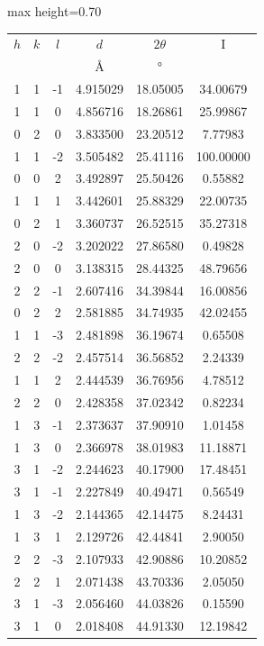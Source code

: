 \documentclass[twoside,a4paper,11pt,addpoints,answers]{exam}%
\begin{document}
\begin{center}
\begin{adjustbox}{max height=0.70\textwidth}
\begin{tabular}{cccccc}
\toprule
$h$ & $k$ & $l$ & $d$ & $2 \theta$ & I \\
 & & & \si{\angstrom} &  \si{\degree} &  \\  
\midrule
 1 & 1 & -1 &  4.915029 &  18.05005 &  34.00679 \\
 1 & 1 &  0 &  4.856716 &  18.26861 &  25.99867 \\
 0 & 2 &  0 &  3.833500 &  23.20512 &   7.77983 \\
 1 & 1 & -2 &  3.505482 &  25.41116 & 100.00000 \\
 0 & 0 &  2 &  3.492897 &  25.50426 &   0.55882 \\
 1 & 1 &  1 &  3.442601 &  25.88329 &  22.00735 \\
 0 & 2 &  1 &  3.360737 &  26.52515 &  35.27318 \\
 2 & 0 & -2 &  3.202022 &  27.86580 &   0.49828 \\
 2 & 0 &  0 &  3.138315 &  28.44325 &  48.79656 \\
 2 & 2 & -1 &  2.607416 &  34.39844 &  16.00856 \\
 0 & 2 &  2 &  2.581885 &  34.74935 &  42.02455 \\
 1 & 1 & -3 &  2.481898 &  36.19674 &   0.65508 \\
 2 & 2 & -2 &  2.457514 &  36.56852 &   2.24339 \\
 1 & 1 &  2 &  2.444539 &  36.76956 &   4.78512 \\
 2 & 2 &  0 &  2.428358 &  37.02342 &   0.82234 \\
 1 & 3 & -1 &  2.373637 &  37.90910 &   1.01458 \\
 1 & 3 &  0 &  2.366978 &  38.01983 &  11.18871 \\
 3 & 1 & -2 &  2.244623 &  40.17900 &  17.48451 \\
 3 & 1 & -1 &  2.227849 &  40.49471 &   0.56549 \\
 1 & 3 & -2 &  2.144365 &  42.14475 &   8.24431 \\
 1 & 3 &  1 &  2.129726 &  42.44841 &   2.90050 \\
 2 & 2 & -3 &  2.107933 &  42.90886 &  10.20852 \\
 2 & 2 &  1 &  2.071438 &  43.70336 &   2.05050 \\
 3 & 1 & -3 &  2.056460 &  44.03826 &   0.15590 \\
 3 & 1 &  0 &  2.018408 &  44.91330 &  12.19842 \\

\end{tabular}
\end{adjustbox}
\end{center}
\end{document}
